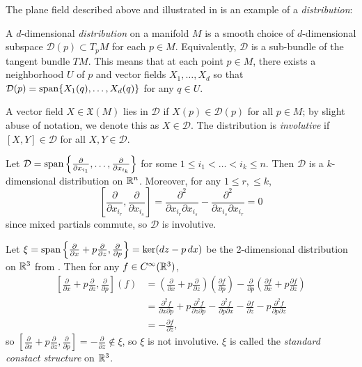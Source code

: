 The plane field described above and illustrated in  is an example of a \emph{distribution}:

\begin{definition}\label{def:distribution}
	A $d$-dimensional \emph{distribution} on a manifold $M$ is a smooth choice of $d$-dimensional subspace $\mathcal{D}(p) \subset T_pM$ for each $p \in M$. Equivalently, $\mathcal{D}$ is a sub-bundle of the tangent bundle $TM$. This means that at each point $p \in M$, there exists a neighborhood $U$ of $p$ and vector fields $X_1, \dots , X_d$ so that $\mathcal{D}(p) = \operatorname{span} \{X_1(q), \dots , X_d(q)\}$ for any $q \in U$.
	
	A vector field $X \in \mathfrak{X}(M)$ lies in $\mathcal{D}$ if $X(p) \in \mathcal{D}(p)$ for all $p \in M$; by slight abuse of notation, we denote this as $X \in \mathcal{D}$. The distribution is \emph{involutive} if $[X,Y] \in \mathcal{D}$ for all $X,Y \in \mathcal{D}$.
\end{definition}

\begin{example}
	Let $\mathcal{D} = \operatorname{span}\left\{ \frac{\partial}{\partial x_{i_1}}, \dots , \frac{\partial}{\partial x_{i_k}}\right\}$ for some $1 \leq i_1 < \dots < i_k \leq n$. Then $\mathcal{D}$ is a $k$-dimensional distribution on $\mathbb{R}^n$. Moreover, for any $1 \leq r , \leq k$, 
	\[
		\left[\frac{\partial}{\partial x_{i_r}}, \frac{\partial}{\partial x_{i_s}}\right] = \frac{\partial^2}{\partial x_{i_r}\partial x_{i_s}} - \frac{\partial^2}{\partial x_{i_s}\partial x_{i_r}}  =0
	\]
	since mixed partials commute, so $\mathcal{D}$ is involutive.
\end{example}

\begin{example}\label{ex:standard contact structure involutive}
	Let $\xi = \operatorname{span} \left\{ \frac{\partial}{\partial x} + p \frac{\partial }{\partial z}, \frac{\partial}{\partial p} \right\} = \ker (dz - p\, dx)$ be the 2-dimensional distribution on $\mathbb{R}^3$ from . Then for any $f \in C^\infty(\mathbb{R}^3)$,
	\begin{align*}
		\left[ \frac{\partial}{\partial x} + p \frac{\partial }{\partial z}, \frac{\partial}{\partial p}\right](f) & = \left(\frac{\partial}{\partial x} + p \frac{\partial }{\partial z}\right)\left(\frac{\partial f}{\partial p}\right) - \frac{\partial}{\partial p} \left(\frac{\partial f}{\partial x} + p \frac{\partial f}{\partial z}\right) \\
		& = \frac{\partial^2 f}{\partial x \partial p} + p \frac{\partial^2 f}{\partial z \partial p} - \frac{\partial^2 f}{\partial p \partial x} - \frac{\partial f}{\partial z} - p\frac{\partial^2 f}{\partial p \partial z} \\
		& = -\frac{\partial f}{\partial z},
	\end{align*}
	so $\left[ \frac{\partial}{\partial x} + p \frac{\partial }{\partial z}, \frac{\partial}{\partial p}\right] = -\frac{\partial}{\partial z} \notin \xi$, so $\xi$ is not involutive. $\xi$ is called the \emph{standard constact structure} on $\mathbb{R}^3$.
\end{example}

